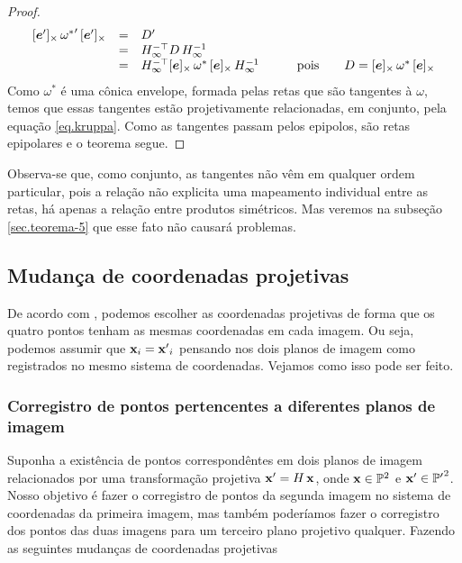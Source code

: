 \begin{proof}
\begin{equation}\label{eq.kruppa}
\begin{array}{rcll}
[\boldsymbol{e}']_\times\,{{\bf \omega}^*}'\,[\boldsymbol{e}']_\times&=&D'&\\
&=&H_\infty^{-\top}D\,H_\infty^{-1}&\\
&=&H_\infty^{-\top}[\boldsymbol{e}]_\times\,{\bf \omega}^*\,[\boldsymbol{e}]_\times\,H_\infty^{-1}&\qquad\text{pois}\qquad D=[\boldsymbol{e}]_\times\,{\bf \omega}^*\,[\boldsymbol{e}]_\times\\
\end{array}
\end{equation}
Como $\omega^*$ é uma cônica envelope, formada pelas retas que são tangentes à $\omega$, temos que essas tangentes estão projetivamente relacionadas, em conjunto, pela equação \ref{eq.kruppa}. Como as tangentes passam pelos epipolos, são retas epipolares e o teorema segue.

\end{proof}
Observa-se que, como conjunto, as tangentes não vêm em qualquer ordem particular, pois a relação não explicita uma mapeamento individual entre as retas, há apenas a relação entre produtos simétricos. Mas veremos na subseção \ref{sec.teorema-5} que esse fato não causará problemas.



\subsection{Mudança de coordenadas projetivas}

De acordo com \cite{kneebone}, podemos escolher as coordenadas projetivas de forma que os quatro pontos tenham as mesmas coordenadas em cada imagem. Ou seja, podemos assumir que ${\bf x}_i = {\bf x'}_i$ pensando nos dois planos de imagem como registrados no mesmo sistema de coordenadas. Vejamos como isso pode ser feito.

\subsubsection{Corregistro de pontos pertencentes a diferentes planos de imagem}\label{sec.corregistro-pontos}
Suponha a existência de pontos correspondêntes em dois planos de imagem relacionados por uma transformação projetiva $\mathbf{x}'=H\,\mathbf{x}$, onde $\mathbf{x}\in {\mathbb{P}^2}$ e $\mathbf{x}'\in {\mathbb{P'}^2}$. Nosso objetivo é fazer o corregistro de pontos da segunda imagem no sistema de coordenadas da primeira imagem, mas também poderíamos fazer o corregistro dos pontos das duas imagens para um terceiro plano projetivo qualquer. Fazendo as seguintes mudanças de coordenadas projetivas

